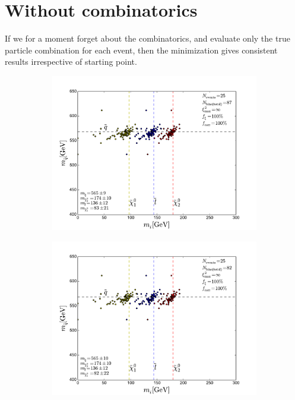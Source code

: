\documentclass[twoside,english]{uiofysmaster}
\begin{document}
\clearpage

\section{Without combinatorics}

If we for a moment forget about the combinatorics, and evaluate only the true particle combination for each event, then the minimization gives consistent results irrespective of starting point. 
\begin{figure}[hbt]
	\centering
	\begin{subfigure}[b]{0.45\textwidth}
		\includegraphics[width=\textwidth]{figures/improving_combinatorics/herwigpp-momcons_nocomb_truemasspoint.pdf} 
		\caption{ }
	\end{subfigure}
	\begin{subfigure}[b]{0.45\textwidth}
		\includegraphics[width=\textwidth]{figures/improving_combinatorics/herwigpp-momcons_nocomb_400-300-200-100.pdf}
		\caption{ } 
	\end{subfigure}


\end{figure}
\end{document}
